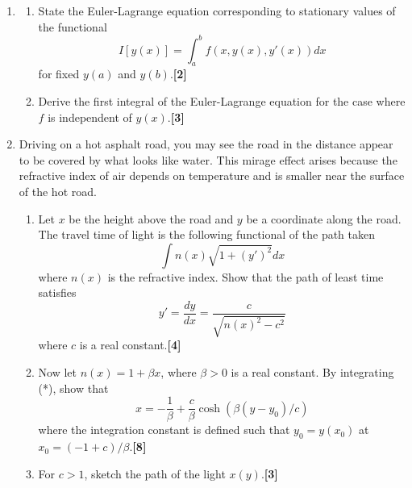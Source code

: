 \documentclass[a4paper]{article}
\begin{document}
\newpage
\begin{qns}\leavevmode
\begin{enumerate}[label=(\roman*)]
\item 
\begin{enumerate}[label=(\alph*)]
\item State the Euler-Lagrange equation corresponding to stationary values of the functional
$$I[y(x)]=\int_a^bf(x,y(x),y'(x))dx$$
for fixed $y(a)$ and $y(b)$.\hfill \textbf{[2]}
\item Derive the first integral of the Euler-Lagrange equation for the case where $f$ is independent of $y(x)$.\hfill \textbf{[3]}
\end{enumerate}
\item Driving on a hot asphalt road, you may see the road in the distance appear to be covered by what looks like water. This mirage effect arises because the refractive index of air depends on temperature and is smaller near the surface of the hot road.
\begin{enumerate}[label=(\alph*)]
\item Let $x$ be the height above the road and $y$ be a coordinate along the road. The travel time of light is the following functional of the path taken
$$\int n(x)\sqrt{1+(y')^2}dx$$
where $n(x)$ is the refractive index. Show that the path of least time satisfies
\begin{equation}
y'=\frac{dy}{dx}=\frac{c}{\sqrt{n(x)^2-c^2}}\tag{*}
\end{equation}
where $c$ is a real constant.\hfill \textbf{[4]}
\item Now let $n(x) = 1 +\beta x$, where $\beta> 0$ is a real constant. By integrating (*), show that 
$$x=-\frac{1}{\beta}+\frac{c}{\beta}\cosh(\beta(y-y_0)/c)$$
where the integration constant is defined such that $y_0=y(x_0)$ at $x_0=(-1+c)/\beta$.\hfill \textbf{[8]}
\item For $c>1$, sketch the path of the light $x(y)$.\hfill \textbf{[3]}
\end{enumerate}
\end{enumerate}
\end{qns}
\end{document}
